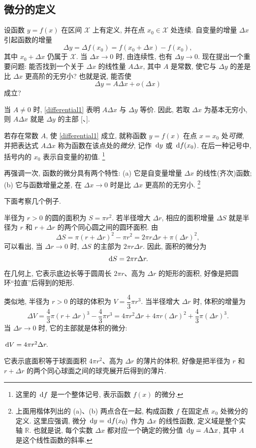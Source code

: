 \subsection{微分的定义}\label{subsec:103}
设函数 $y=f(x)$ 在区间 $\mathcal{X}$ 上有定义, 并在点 $x_0\in\mathcal{X}$ 处连续.
自变量的增量 $\Delta x$ 引起函数的增量
$$
\Delta y=\Delta f(x_0)=f(x_0+\Delta x)-f(x_0),
$$
其中 $x_0+\Delta x$ 仍属于 $\mathcal{X}$.
当 $\Delta x\to0$ 时, 由连续性, 也有 $\Delta y\to0$.
现在提出一个重要问题:
能否找到一个关于 $\Delta x$ 的线性量 $A\Delta x$, 其中 $A$ 是常数,
使它与 $\Delta y$ 的差是比 $\Delta x$ 更高阶的无穷小?
也就是说, 能否使
\begin{equation}\label{differential1}
\Delta y=A\Delta x+o(\Delta x)
\end{equation}
成立?

当 $A\neq0$ 时, \eqref{differential1} 表明 $A\Delta x$ 与 $\Delta y$ 等价.
因此, 若取 $\Delta x$ 为基本无穷小, 则 $A\Delta x$ 就是 $\Delta y$ 的主部
[、].

\label{def:differential}
{\kaishu 若存在常数 $A$, 使 \eqref{differential1} 成立,
就称函数 $y=f(x)$ 在点 $x=x_0$ 处\emph{可微},
并把表达式 $A\Delta x$ 称为函数在该点处的\emph{微分},
记作 $\,\mathrm{d} y$ 或 $\,\mathrm{d} f(x_0)$.}
在后一种记号中, 括号内的 $x_0$ 表示自变量的初值.
\footnote{这里的 $\,\mathrm{d} f$ 是一个整体记号, 表示函数 $f(x)$ 的微分.}

再强调一次, 函数的微分具有两个特性:
{\kaishu (a) 它是自变量增量 $\Delta x$ 的线性(齐次)函数;
(b) 它与函数增量之差, 在 $\Delta x\to0$ 时是比 $\Delta x$ 更高阶的无穷小.}
\footnote{上面用楷体列出的 (a)、(b) 两点合在一起, 构成函数 $f$ 在固定点 $x_0$ 处微分的定义.
这里应强调, 微分 $\,\mathrm{d} y=\,\mathrm{d} f(x_0)$ 作为 $\Delta x$ 的线性函数, 定义域是整个实轴 $\mathbb{R}$.
也就是说, 每个实数 $\Delta x$ 都对应一个确定的微分值 $\,\mathrm{d} y=A\Delta x$,
其中 $A$ 是这个线性函数的斜率.}

下面考察几个例子.

\label{ex:differential_circle_area}
半径为 $r>0$ 的圆的面积为 $S=\pi r^2$.
若半径增大 $\Delta r$, 相应的面积增量 $\Delta S$
就是半径为 $r$ 和 $r+\Delta r$ 的两个同心圆之间的圆环面积.
由
$$
\Delta S=\pi(r+\Delta r)^2-\pi r^2
=2\pi r\Delta r+\pi(\Delta r)^2,
$$
可以看出, 当 $\Delta r\to0$ 时, $\Delta S$ 的主部为 $2\pi r\Delta r$.
因此, 面积的微分为
$$
\,\mathrm{d} S=2\pi r\Delta r.
$$
在几何上, 它表示底边长等于圆周长 $2\pi r$、高为 $\Delta r$ 的矩形的面积,
好像是把圆环“拉直”后得到的矩形.

\label{ex:differential_sphere_volume}
类似地, 半径为 $r>0$ 的球的体积为 $V=\dfrac43\pi r^3$.
当半径增大 $\Delta r$ 时, 体积的增量为
$$
\Delta V=\frac43\pi(r+\Delta r)^3-\frac43\pi r^3=4\pi r^2\Delta r+4\pi r(\Delta r)^2+\frac43\pi(\Delta r)^3.
$$
当 $\Delta r\to0$ 时, 它的主部就是体积的微分:
\begin{center}$
\,\mathrm{d} V=4\pi r^2\Delta r.
$\end{center}
它表示底面积等于球面面积 $4\pi r^2$、高为 $\Delta r$ 的薄片的体积,
好像是把半径为 $r$ 和 $r+\Delta r$ 的两个同心球面之间的球壳展开后得到的薄片.

